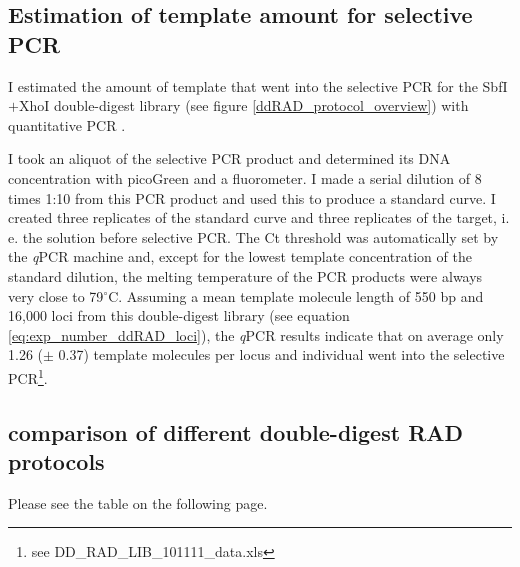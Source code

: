 \documentclass[a4paper,12pt,times,authoryear,twoside,print,index]{Classes/PhDThesisPSnPDF}\usepackage[]{graphicx}\usepackage[]{color}
\begin{document}
%
%
%

\FloatBarrier
\subsection{Estimation of template amount for selective PCR}\label{ch:qPCR}

I estimated the amount of template that went into the selective PCR for the SbfI$+$XhoI double-digest library (see figure \ref{ddRAD_protocol_overview}) with quantitative PCR \citep{Rutledge2003}.

I took an aliquot of the selective PCR product and determined its DNA concentration with picoGreen and a fluorometer. I made a serial dilution of 8 times 1:10 from this PCR product and used this to produce a standard curve. I created three replicates of the standard curve and three replicates of the target, i. e. the solution before selective PCR. The \gls{Ct} threshold was automatically set by the \textit{q}PCR machine and, except for the lowest template concentration of the standard dilution, the melting temperature of the PCR products were always very close to 79$^{\circ}$C. Assuming a mean template molecule length of 550 \gls{bp} and 16,000 loci from this double-digest library (see equation \ref{eq:exp_number_ddRAD_loci}), the \textit{q}PCR results indicate that on average only 1.26 ($\pm$ 0.37) template molecules per locus and individual went into the selective PCR\footnote{see DD\_RAD\_LIB\_101111\_data.xls}.


\FloatBarrier
\subsection{comparison of different double-digest RAD protocols}

Please see the table on the following page.\label{compProt}

\pagebreak
\end{document}
